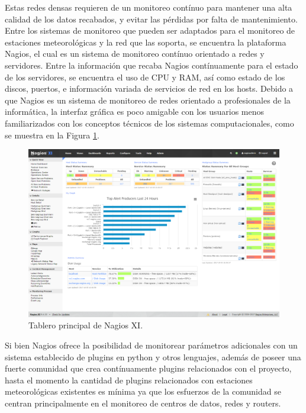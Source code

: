 


Estas redes densas requieren de un monitoreo contínuo para mantener una alta calidad de los datos recabados, y evitar las pérdidas por falta de mantenimiento. Entre los sistemas de monitoreo que pueden ser adaptados para el monitoreo de estaciones meteorológicas y la red que las soporta, se encuentra la plataforma Nagios, el cual es un sistema de monitoreo contínuo orientado a redes y servidores. Entre la información que recaba Nagios contínuamente para el estado de los servidores, se encuentra el uso de CPU y RAM, así como estado de los discos, puertos, e información variada de servicios de red en los hosts. Debido a que Nagios es un sistema de monitoreo de redes orientado a profesionales de la informática, la interfaz gráfica es poco amigable con los usuarios menos familiarizados con los conceptos técnicos de los sistemas computacionales, como se muestra en la Figura \ref{fig:nagios_dashboard}.

\begin{figure}[!ht]
	\centering
	\includegraphics[width=1\linewidth]{images/Nagios_home_dashboard.png}
	\caption{Tablero principal de Nagios XI.}
	\label{fig:nagios_dashboard}
\end{figure}

Si bien Nagios ofrece la posibilidad de monitorear parámetros adicionales con un sistema establecido de plugins en python y otros lenguajes, además de poseer una fuerte comunidad que crea contínuamente plugins relacionados con el proyecto, hasta el momento la cantidad de plugins relacionados con estaciones meteorológicas existentes es mínima ya que los esfuerzos de la comunidad se centran principalmente en el monitoreo de centros de datos, redes y routers.

